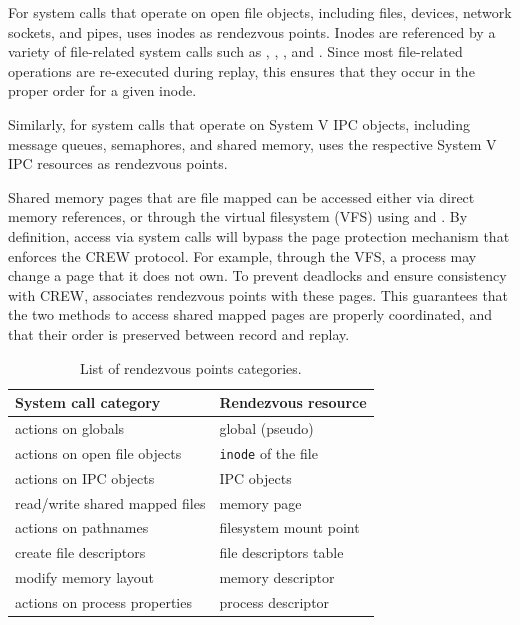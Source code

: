  

For system calls that operate on open file objects, including files,
devices, network sockets, and pipes, \scribe{} uses inodes as
rendezvous points.  Inodes are referenced by a variety of file-related
system calls such as , ,
,
and .  Since most
file-related operations are re-executed during replay, this ensures
that they occur in the proper order for a given inode.
 
Similarly, for system calls that operate on System V IPC
objects, including message queues, semaphores, and shared memory,
\scribe{} uses the respective System V IPC resources as rendezvous points.

Shared memory pages that are file mapped can be accessed either via
direct memory references, or through the virtual filesystem (VFS)
using  and . By definition, access via
system calls will bypass the page protection mechanism that enforces
the CREW protocol. For example, through the VFS, a process may change a
page that it does not own. To prevent deadlocks and ensure consistency
with CREW, \scribe{} associates rendezvous points with these pages.
This guarantees that the two methods to access shared mapped pages are
properly coordinated, and that their order is preserved between record
and replay.

\begin{table}[]
\begin{center}
\begin{tabular}{|l|l|}
  \hline
  {\bf System call category}     & {\bf Rendezvous resource} \\ \hline
  actions on globals             & global (pseudo)           \\ \hline
  actions on open file objects   & {\tt inode} of the file   \\ \hline
  actions on IPC objects         & IPC objects               \\ \hline
  read/write shared mapped files & memory page               \\ \hline
  actions on pathnames           & filesystem mount point    \\ \hline
  create file descriptors        & file descriptors table    \\ \hline
  modify memory layout           & memory descriptor         \\ \hline
  actions on process properties  & process descriptor        \\ \hline
\end{tabular}
\end{center}
\caption{List of rendezvous points categories.}
\label{scribe:tab:rendezvous}
\end{table}

